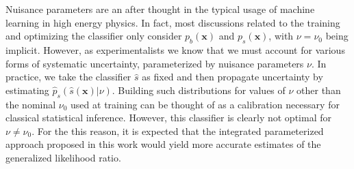 \documentclass[12pt]{article}
\numberwithin{equation}{section}
\theoremstyle{plain}
\begin{document}



Nuisance parameters are an after thought in the typical usage of machine
learning in high energy physics. In fact, most discussions related to the training and
optimizing the classifier only consider $p_b(\mathbf{x})$ and $p_s(\mathbf{x})$, with $\nu=\nu_0$
being implicit. However, as experimentalists we know that we must account for
various forms of systematic uncertainty, parameterized by nuisance parameters
$\nu$. In practice, we take the classifier $\hat s$ as fixed and then propagate
uncertainty by estimating $\hat{p}_s(\hat s(\mathbf{x}) | \nu)$. Building such
distributions for values of $\nu$ other than the nominal $\nu_0$
used at training can be thought of as a calibration necessary for
classical statistical inference. However, this classifier is clearly not optimal
for $\nu \ne \nu_0$. For the this reason, it is expected that the integrated parameterized approach proposed in this work
would yield more accurate estimates of the generalized likelihood ratio.
\end{document}
